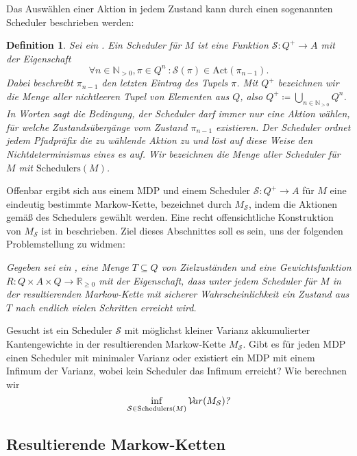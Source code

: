 \documentclass[a4paper]{article}
\newcommand{\mc}{Markow-Kette}
\newtheorem{definition}[satz]{Definition} %
\theoremstyle{nonumberplain}
\begin{document}
	Das Auswählen einer Aktion in jedem Zustand kann durch einen sogenannten Scheduler beschrieben werden:
	\newcommand{\msch}{\mathrm{Schedulers}}
	\begin{definition}
		Sei \mdpex{} ein \mdp{}. Ein Scheduler für $M$ ist eine Funktion $\mathcal{S} : Q^+ \to A$ mit der Eigenschaft
		\begin{equation}
		\forall n \in \mathbb{N}_{>0}, \pi \in Q^n\ : \mathcal{S}(\pi) \in \mathrm{Act}(\pi_{n-1})\text{.}
		\end{equation}
		Dabei beschreibt $\pi_{n-1}$ den letzten Eintrag des Tupels $\pi$. Mit $Q^+$ bezeichnen wir die Menge aller nichtleeren Tupel von Elementen aus $Q$, also $Q^+ \coloneqq \bigcup_{n \in \mathbb{N}_{>0}} Q^n$. In Worten sagt die Bedingung, der Scheduler darf immer nur eine Aktion wählen, für welche Zustandsübergänge vom Zustand $\pi_{n-1}$ existieren. Der Scheduler ordnet jedem Pfadpräfix die zu wählende Aktion zu und löst auf diese Weise den Nichtdeterminismus eines \mdp{}es auf.
		Wir bezeichnen die Menge aller Scheduler für $M$ mit $\mathrm{Schedulers}(M)$.
	\end{definition}
	
	\!Offenbar ergibt sich aus einem MDP \mdpex{} und einem Scheduler $\mathcal{S} : Q^+ \to A$ für $M$ eine eindeutig bestimmte \mc{}, bezeichnet durch $M_{\mathcal{S}}$, indem die Aktionen gemäß des Schedulers gewählt werden. Eine recht offensichtliche Konstruktion von $M_{\mathcal{S}}$ ist in \cite{Bai08} beschrieben. Ziel dieses Abschnittes soll es sein, uns der folgenden Problemstellung zu widmen:
	
	\medskip
	{ \slshape
		Gegeben sei ein \mdp{} \mdpex{}, eine Menge $T \subseteq Q$ von Zielzuständen und eine Gewichtsfunktion $R : Q \times A \times Q \to \mathbb{R}_{\geq 0}$ mit der Eigenschaft, dass unter jedem Scheduler für $M$ in der resultierenden \mc{} mit sicherer Wahrscheinlichkeit ein Zustand aus $T$ nach endlich vielen Schritten erreicht wird.
		
		Gesucht ist ein Scheduler $\mathcal{S}$ mit möglichst kleiner Varianz akkumulierter Kantengewichte in der resultierenden \mc{} $M_{\mathcal{S}}$. Gibt es für jeden MDP einen Scheduler mit minimaler Varianz oder existiert ein MDP mit einem Infimum der Varianz, wobei kein Scheduler das Infimum erreicht? Wie berechnen wir
		\[\inf_{\mathcal{S} \in \mathrm{Schedulers}(M)}{\mvar(M_\mathcal{S})} \text{\slshape ?}\]
	}
	\medskip
	
	\subsection{Resultierende \mc{}n}
	
\end{document}
